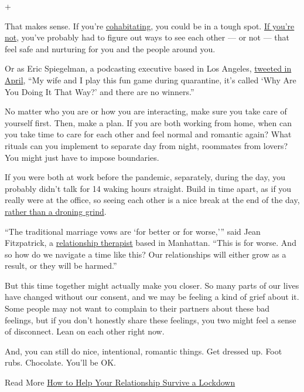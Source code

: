 +

That makes sense. If you're
\href{https://www.nytimes3xbfgragh.onion/2020/05/26/style/coronavirus-living-together-callout.html}{cohabitating},
you could be in a tough spot.
\href{https://www.nytimes3xbfgragh.onion/2020/04/30/smarter-living/coronavirus-long-distance-relationships.html}{If
you're not}, you've probably had to figure out ways to see each other
--- or not --- that feel safe and nurturing for you and the people
around you.

Or as Eric Spiegelman, a podcasting executive based in Los Angeles,
\href{https://twitter.com/ericspiegelman/status/1246488909221003264?lang=en}{tweeted
in April}, ``My wife and I play this fun game during quarantine, it's
called `Why Are You Doing It That Way?' and there are no winners.''

No matter who you are or how you are interacting, make sure you take
care of yourself first. Then, make a plan. If you are both working from
home, when can you take time to care for each other and feel normal and
romantic again? What rituals can you implement to separate day from
night, roommates from lovers? You might just have to impose boundaries.

If you were both at work before the pandemic, separately, during the
day, you probably didn't talk for 14 waking hours straight. Build in
time apart, as if you really were at the office, so seeing each other is
a nice break at the end of the day,
\href{https://www.nytimes3xbfgragh.onion/2020/07/08/parenting/coronavirus-marriage-relationships.html}{rather
than a droning grind}.

``The traditional marriage vows are `for better or for worse,''' said
Jean Fitzpatrick, a \href{https://therapistnyc.com/}{relationship
therapist} based in Manhattan. ``This is for worse. And so how do we
navigate a time like this? Our relationships will either grow as a
result, or they will be harmed.''

But this time together might actually make you closer. So many parts of
our lives have changed without our consent, and we may be feeling a kind
of grief about it. Some people may not want to complain to their
partners about these bad feelings, but if you don't honestly share these
feelings, you two might feel a sense of disconnect. Lean on each other
right now.

And, you can still do nice, intentional, romantic things. Get dressed
up. Foot rubs. Chocolate. You'll be OK.

Read More
\href{https://www.nytimes3xbfgragh.onion/2020/04/03/smarter-living/coronavirus-relationship-advice.html}{How
to Help Your Relationship Survive a Lockdown}

